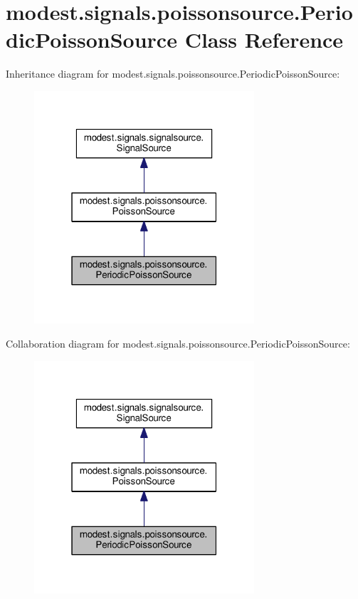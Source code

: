 \hypertarget{classmodest_1_1signals_1_1poissonsource_1_1PeriodicPoissonSource}{}\section{modest.\+signals.\+poissonsource.\+Periodic\+Poisson\+Source Class Reference}
\label{classmodest_1_1signals_1_1poissonsource_1_1PeriodicPoissonSource}


Inheritance diagram for modest.\+signals.\+poissonsource.\+Periodic\+Poisson\+Source\+:\nopagebreak
\begin{figure}[H]
\begin{center}
\leavevmode
\includegraphics[width=232pt]{classmodest_1_1signals_1_1poissonsource_1_1PeriodicPoissonSource__inherit__graph}
\end{center}
\end{figure}


Collaboration diagram for modest.\+signals.\+poissonsource.\+Periodic\+Poisson\+Source\+:\nopagebreak
\begin{figure}[H]
\begin{center}
\leavevmode
\includegraphics[width=232pt]{classmodest_1_1signals_1_1poissonsource_1_1PeriodicPoissonSource__coll__graph}
\end{center}
\end{figure}
